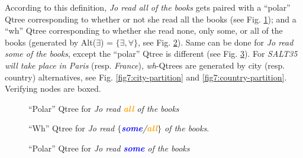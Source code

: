 According to this definition, \textit{Jo read all of the books} gets paired with a ``polar'' Qtree corresponding to whether or not she read all the books (see Fig. \ref{fig7:all-not-all}); and a ``wh'' Qtree corresponding to whether she read none, only some, or all of the books (generated by Alt($\exists$) = $\lbrace \exists, \forall\rbrace$, see Fig. \ref{fig7:none-sbna-all}). Same can be done for \textit{Jo read some of the books}, except the ``polar'' Qtree is different (see Fig. \ref{fig7:some-not-some}). For \textit{SALT35 will take place in Paris} (resp. \textit{France}), \textit{wh}-Qtrees are generated by city (resp. country) alternatives, see Fig. \ref{fig7:city-partition} and \ref{fig7:country-partition}. Verifying nodes are boxed.

\hspace*{-6mm}\begin{minipage}{.25\linewidth}
	\centering
	\begin{figure}[H]
		\centering
		\caption{``Polar'' Qtree for \textit{Jo read \textbf{\textcolor{orange}{all}} of the books}}\label{fig7:all-not-all}
	\end{figure}
\end{minipage}\hfill
\begin{minipage}{.3\linewidth}
	\centering
	\begin{figure}[H]
		\centering
		\caption{``Wh'' Qtree for \textit{Jo read $\lbrace$\textbf{\textcolor{blue}{some}}/\textbf{\textcolor{orange}{all}}$\rbrace$ of the books}.}\label{fig7:none-sbna-all}
	\end{figure}
\end{minipage}\hfill
\begin{minipage}{.25\linewidth}
	\centering
	\begin{figure}[H]
		\centering
		\caption{``Polar'' Qtree for \textit{Jo read \textbf{\textcolor{blue}{some}} of the books}}\label{fig7:some-not-some}
	\end{figure}
\end{minipage}



